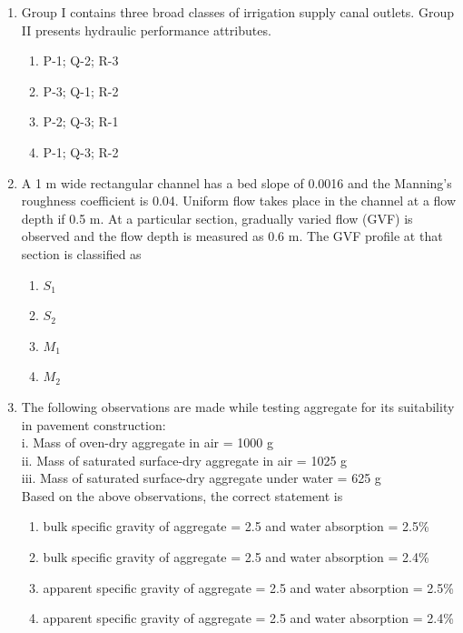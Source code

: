 \documentclass[journal]{IEEEtran}
\begin{document}
\begin{enumerate}
\item Group I contains three broad classes of irrigation supply canal outlets. Group II presents hydraulic performance attributes.

\begin{multicols}{2}
    \begin{enumerate}
        \item P-1; Q-2; R-3
        \item P-3; Q-1; R-2
        \item P-2; Q-3; R-1
        \item P-1; Q-3; R-2
    \end{enumerate}
\end{multicols}

\item A 1 m wide rectangular channel has a bed slope of 0.0016 and the Manning's roughness coefficient is 0.04. Uniform flow takes place in the channel at a flow depth if 0.5 m. At a particular section, gradually varied flow (GVF) is observed and the flow depth is measured as 0.6 m. The GVF profile at that section is classified as
\begin{multicols}{2}
    \begin{enumerate}
        \item $S_1$
        \item $S_2$
        \item $M_1$
        \item $M_2$
    \end{enumerate}
\end{multicols}

\item The following observations are made while testing aggregate for its suitability in pavement construction:\\
i. Mass of oven-dry aggregate in air = 1000 g\\
ii. Mass of saturated surface-dry aggregate in air = 1025 g\\
iii. Mass of saturated surface-dry aggregate under water = 625 g\\
Based on the above observations, the correct statement is
\begin{multicols}{2}
    \begin{enumerate}
        \item bulk specific gravity of aggregate = 2.5 and water absorption = 2.5\%
        \item bulk specific gravity of aggregate = 2.5 and water absorption = 2.4\%
        \item apparent specific gravity of aggregate = 2.5 and water absorption = 2.5\%
        \item apparent specific gravity of aggregate = 2.5 and water absorption = 2.4\%
    \end{enumerate}
\end{multicols}


\end{enumerate}
\end{document}
